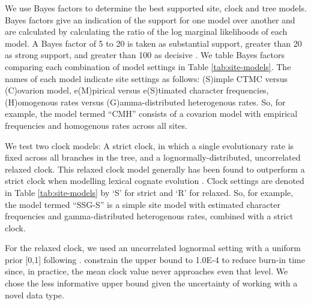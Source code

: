 \documentclass[]{article}
\begin{document}
We use Bayes factors to determine the best supported site, clock and tree models. Bayes factors give an indication of the support for one model over another and are calculated by calculating the ratio of the log marginal likelihoods of each model. A Bayes factor of 5 to 20 is taken as substantial support, greater than 20 as strong support, and greater than 100 as decisive \autocite{kass_bayes_1995}. We table Bayes factors comparing each combination of model settings in Table \ref{tab:site-models}. The names of each model indicate site settings as follows: (S)imple CTMC versus (C)ovarion model, e(M)pirical versus e(S)timated character frequencies, (H)omogenous rates versus (G)amma-distributed heterogenous rates. So, for example, the model termed ``CMH'' consists of a covarion model with empirical frequencies and homogenous rates across all sites.

We test two clock models: A strict clock, in which a single evolutionary rate is fixed across all branches in the tree, and a lognormally-distributed, uncorrelated relaxed clock. This relaxed clock model generally has been found to outperform a strict clock when modelling lexical cognate evolution \autocites{bouckaert_origin_2018}{kolipakam_bayesian_2018}. Clock settings are denoted in Table \ref{tab:site-models} by `S' for strict and `R' for relaxed. So, for example, the model termed ``SSG-S'' is a simple site model with estimated character frequencies and gamma-distributed heterogenous rates, combined with a strict clock.

For the relaxed clock, we used an uncorrelated lognormal setting with a uniform prior {[}0,1{]} following \textcite{kolipakam_bayesian_2018}. \textcite{bouckaert_origin_2018} constrain the upper bound to 1.0E-4 to reduce burn-in time since, in practice, the mean clock value never approaches even that level. We chose the less informative upper bound given the uncertainty of working with a novel data type.
\end{document}
